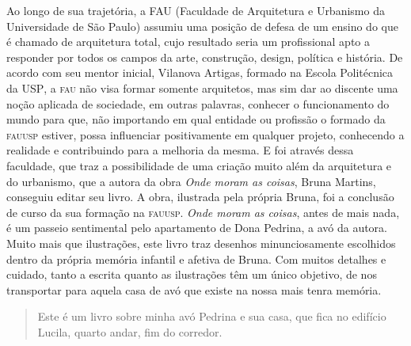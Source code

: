\documentclass[11pt]{extarticle}
\begin{document}
Ao longo de sua trajetória, a \textsc{FAU} (Faculdade de Arquitetura e Urbanismo da Universidade de São Paulo) assumiu uma posição de defesa de um ensino do que é chamado de arquitetura total, cujo resultado seria um profissional apto a responder por todos os campos da arte, construção, design, política e história. De acordo com seu mentor inicial, Vilanova Artigas, formado na Escola Politécnica da \textsc{USP}, a \textsc{fau} não visa formar somente arquitetos, mas sim dar ao discente uma noção aplicada de sociedade, em outras palavras, conhecer o funcionamento do mundo para que, não importando em qual entidade ou profissão o formado da \textsc{fauusp} estiver, possa influenciar positivamente em qualquer projeto, conhecendo a realidade e contribuindo para a melhoria da mesma. E foi através dessa faculdade, que traz a possibilidade de uma criação muito além da arquitetura e do urbanismo, que a autora da obra \textit{Onde moram as coisas}, Bruna Martins, conseguiu editar seu livro. A obra, ilustrada pela própria Bruna, foi a conclusão de curso da sua formação na \textsc{fauusp}. \textit{Onde moram as coisas}, antes de mais nada, é um passeio sentimental pelo apartamento de Dona Pedrina, a avó da autora. Muito mais que ilustrações, este livro traz desenhos minunciosamente escolhidos dentro da própria memória infantil e afetiva de Bruna. Com muitos detalhes e cuidado, tanto a escrita quanto as ilustrações têm um único objetivo, de nos transportar para aquela casa de avó que existe na nossa mais tenra memória. 


\begin{quote}

Este é um livro sobre minha avó Pedrina e sua casa, que fica no edifício Lucila, quarto andar, fim do corredor.

\end{quote}
\end{document}
